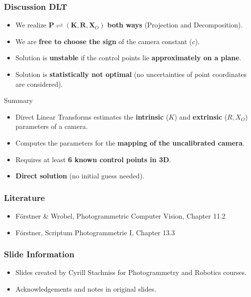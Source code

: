\begin{frame}
  \frametitle{Discussion DLT}
    \begin{itemize}
        \item We realize $\mathbf{P} \rightleftharpoons (\mathbf{K}, \mathbf{R}, \mathbf{X}_O)$ \textbf{both ways} (Projection and Decomposition).
        \item We are \textbf{free to choose the sign} of the camera constant ($c$).
        \item Solution is \textbf{unstable} if the control points lie \textbf{approximately on a plane}.
        \item Solution is \textbf{statistically not optimal} (no uncertainties of point coordinates are considered).
    \end{itemize}
\end{frame}

\begin{frame}{Summary}
    \begin{itemize}
        \item Direct Linear Transforms estimates the \textbf{intrinsic} ($K$) and \textbf{extrinsic} ($R, X_O$) parameters of a camera.
        \item Computes the parameters for the \textbf{mapping of the uncalibrated camera}.
        \item Requires at least \textbf{6 known control points in 3D}.
        \item \textbf{Direct solution} (no initial guess needed).
    \end{itemize}
\end{frame}

\begin{frame}
  \frametitle{Literature}
  \begin{itemize}
    \item Förstner \& Wrobel, Photogrammetric Computer Vision, Chapter 11.2
    \item Förstner, Scriptum Photogrammetrie I, Chapter 13.3
  \end{itemize}
\end{frame}

\begin{frame}
  \frametitle{Slide Information}
  \begin{itemize}
    \item Slides created by Cyrill Stachniss for Photogrammetry and Robotics courses.
    \item Acknowledgements and notes in original slides.
  \end{itemize}
\end{frame}

